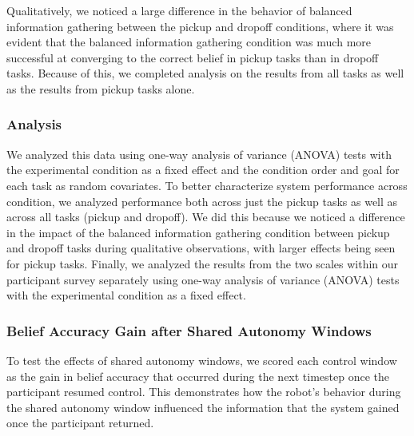 \documentclass[conference]{IEEEtran}
\begin{document}
Qualitatively, we noticed a large difference in the behavior of balanced information gathering between the pickup and dropoff conditions, where it was evident that the balanced information gathering condition was much more successful at converging to the correct belief in pickup tasks than in dropoff tasks. Because of this, we completed analysis on the results from all tasks as well as the results from pickup tasks alone. 

\subsubsection{Analysis}

We analyzed this data using one-way analysis of variance (ANOVA) tests with the experimental condition as a fixed effect and the condition order and goal for each task as random covariates. To better characterize system performance across condition, we analyzed performance both across just the pickup tasks as well as across all tasks (pickup and dropoff). We did this because we noticed a difference in the impact of the balanced information gathering condition between pickup and dropoff tasks during qualitative observations, with larger effects being seen for pickup tasks. Finally, we analyzed the results from the two scales within our participant survey separately using one-way analysis of variance (ANOVA) tests with the experimental condition as a fixed effect.

\subsubsection{Belief Accuracy Gain after Shared Autonomy Windows}
To test the effects of shared autonomy windows, we scored each control window as the gain in belief accuracy that occurred during the next timestep once the participant resumed control. This demonstrates how the robot's behavior during the shared autonomy window influenced the information that the system gained once the participant returned.
\end{document}
